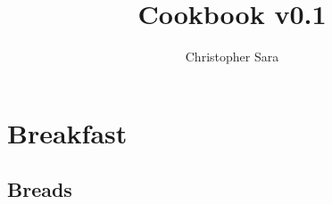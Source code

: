 \documentclass[12pt]{article}
\begin{document}
\title{Cookbook v0.1}
\author{Christopher Sara}
\maketitle

\newpage

\tableofcontents


\newpage

\section{Breakfast}
\newpage


\subsection{Breads}
\newpage
\end{document}
